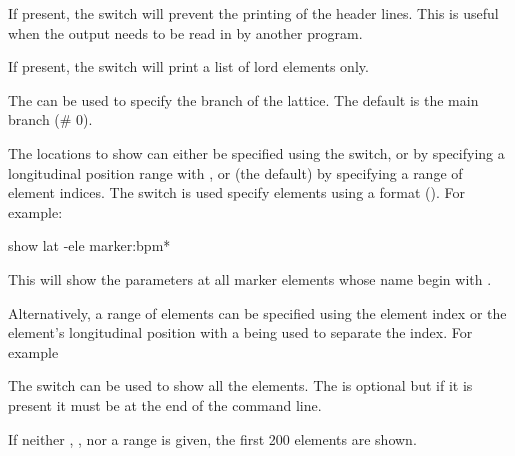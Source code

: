 {If present, the  switch will prevent the printing of
the header lines. This is useful when the output needs to be read in
by another program.

If present, the  switch will print a list of lord elements only.

The  can be used to specify the branch of the lattice.
The default is the main branch (\# 0).

The locations to show can either be specified using the 
switch, or by specifying a longitudinal position range with ,
or (the default) by specifying a range of element indices.  The
 switch is used specify elements using a 
format (). For example:
\begin{example}
  show lat -ele marker:bpm*
\end{example}
This will show the parameters at all marker elements whose name begin
with . 

Alternatively, a range of elements can be specified using the element
index or the element's longitudinal position with a  being
used to separate the index. For example
The  switch can be used to show all the elements. The
 is optional but if it is present it must be at the
end of the command line.

If neither , , nor a range is given, the first
200 elements are shown.

}
